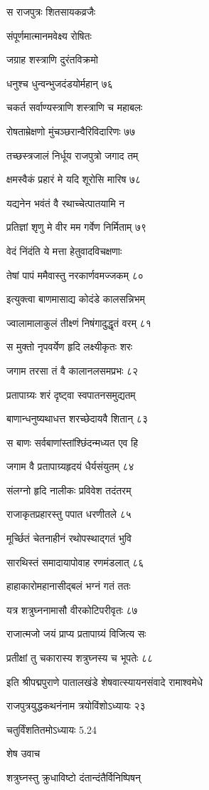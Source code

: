 स राजपुत्रः शितसायकव्रजैः

संपूर्णमात्मानमवेक्ष्य रोषितः

जग्राह शस्त्राणि दुरंतविक्रमो

धनुश्च धुन्वन्भुजदंडयोर्महान् ७६

चकर्त सर्वाण्यस्त्राणि शस्त्राणि च महाबलः

रोषताम्रेक्षणो मुंचञ्छरान्वैरिविदारिणः ७७

तच्छस्त्रजालं निर्धूय राजपुत्रो जगाद तम्

क्षमस्वैकं प्रहारं मे यदि शूरोसि मारिष ७८

यद्यनेन भवंतं वै रथाच्चेत्पातयामि न

प्रतिज्ञां शृणु मे वीर मम गर्वेण निर्मिताम् ७९

वेदं निंदंति ये मत्ता हेतुवादविचक्षणाः

तेषां पापं ममैवास्तु नरकार्णवमज्जकम् ८०

इत्युक्त्वा बाणमासाद्य कोदंडे कालसन्निभम्

ज्वालामालाकुलं तीक्ष्णं निषंगादुद्धृतं वरम् ८१

स मुक्तो नृपवर्येण हृदि लक्ष्यीकृतः शरः

जगाम तरसा तं वै कालानलसमप्रभः ८२

प्रतापाग्र्यः शरं दृष्ट्वा स्वपातनसमुद्यतम्

बाणान्धनुष्यथाधत्त शरच्छेदायवै शितान् ८३

स बाणः सर्वबाणांस्तांश्छिंदन्मध्यत एव हि

जगाम वै प्रतापाग्र्यहृदयं धैर्यसंयुतम् ८४

संलग्नो हृदि नालीकः प्रविवेश तदंतरम्

राजाकृतप्रहारस्तु पपात धरणीतले ८५

मूर्च्छितं चेतनाहीनं रथोपस्थाद्गतं भुवि

सारथिस्तं समादायापोवाह रणमंडलात् ८६

हाहाकारोमहानासीद्बलं भग्नं गतं ततः

यत्र शत्रुघ्ननामासौ वीरकोटिपरीवृतः ८७

राजात्मजो जयं प्राप्य प्रतापाग्र्यं विजित्य सः

प्रतीक्षां तु चकारास्य शत्रुघ्नस्य च भूपतेः ८८

इति श्रीपद्मपुराणे पातालखंडे शेषवात्स्यायनसंवादे रामाश्वमेधे

राजपुत्रयुद्धकथनंनाम त्रयोविंशोऽध्यायः २३

चतुर्विंशतितमोऽध्यायः 5.24

शेष उवाच

शत्रुघ्नस्तु क्रुधाविष्टो दंतान्दंतैर्विनिष्पिषन्


